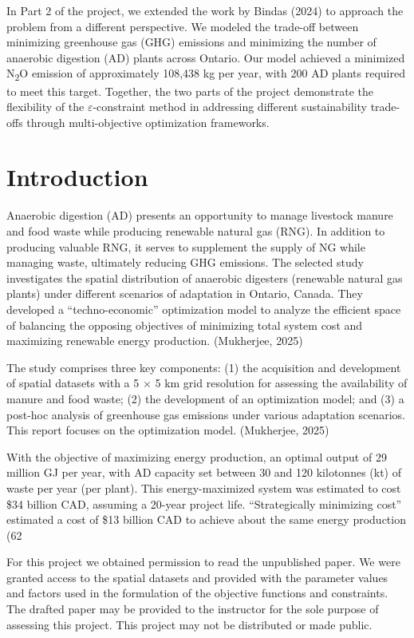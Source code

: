 \documentclass[12pt]{article}
\begin{document}
In Part 2 of the project, we extended the work by Bindas (2024) to approach the problem from a different perspective. We modeled the trade-off between minimizing greenhouse gas (GHG) emissions and minimizing the number of anaerobic digestion (AD) plants across Ontario. Our model achieved a minimized N\textsubscript{2}O emission of approximately 108,438 kg per year, with 200 AD plants required to meet this target. Together, the two parts of the project demonstrate the flexibility of the $\varepsilon$-constraint method in addressing different sustainability trade-offs through multi-objective optimization frameworks.


\section{Introduction}
Anaerobic digestion (AD) presents an opportunity to manage livestock manure and food waste while producing renewable natural gas (RNG). In addition to producing valuable RNG, it serves to supplement the supply of NG while managing waste, ultimately reducing GHG emissions. 
The selected study investigates the spatial distribution of anaerobic digesters (renewable natural gas plants) under different scenarios of adaptation in Ontario, Canada. They developed a “techno-economic” optimization model to analyze the efficient space of balancing the opposing objectives of minimizing total system cost and maximizing renewable energy production. (Mukherjee, 2025) 

The study comprises three key components: (1) the acquisition and development of spatial datasets with a 5 × 5 km grid resolution for assessing the availability of manure and food waste; (2) the development of an optimization model; and (3) a post-hoc analysis of greenhouse gas emissions under various adaptation scenarios. This report focuses on the optimization model. (Mukherjee, 2025) 

With the objective of maximizing energy production, an optimal output of 29 million GJ per year, with AD capacity set between 30 and 120 kilotonnes (kt) of waste per year (per plant). This energy-maximized system was estimated to cost \$34 billion CAD, assuming a 20-year project life. “Strategically minimizing cost” estimated a cost of \$13 billion CAD to achieve about the same energy production (62%

For this project we obtained permission to read the unpublished paper. We were granted access to the spatial datasets and provided with the parameter values and factors used in the formulation of the objective functions and constraints. The drafted paper may be provided to the instructor for the sole purpose of assessing this project. This project may not be distributed or made public.
\end{document}

